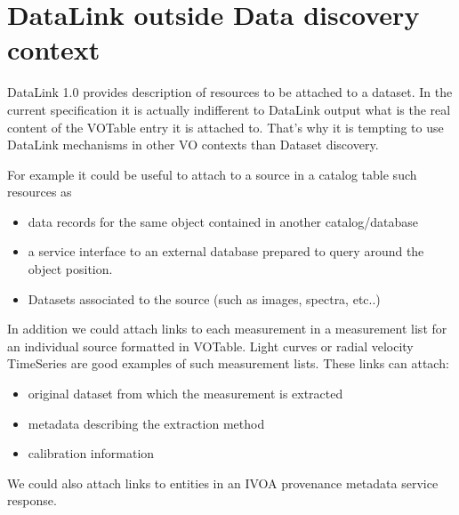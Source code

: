 \documentclass[11pt,a4paper]{ivoa}
\begin{document}
\section{DataLink outside Data discovery context}

DataLink 1.0 provides description of resources to be attached to a dataset. In the current specification it is actually indifferent to DataLink output what is the real content of the VOTable entry it is attached to. That's why it is   tempting to use DataLink mechanisms in other VO contexts than Dataset discovery.

  For example it could be useful to attach to a source in a catalog table such resources as 
\begin{itemize}
\item data  records for the same object contained in another catalog/database 
\item a service interface to an external  database prepared to query around the object position.
\item Datasets associated to the source (such as images, spectra, etc..) 
\end{itemize}
     In addition we could attach links to each measurement in a measurement list for an individual source formatted in VOTable.  Light curves or radial velocity TimeSeries are good examples of such measurement lists. These links can attach:
\begin{itemize}
\item original dataset from which the measurement is extracted 
\item metadata describing the extraction method 
\item calibration information  
\end{itemize}
We could also attach links to entities in an IVOA provenance metadata service response.
\end{document}
